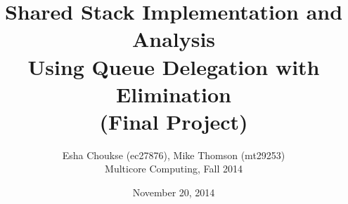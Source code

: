 \documentclass[11pt,letterpaper]{article}
\begin{document}
\title{Shared Stack Implementation and Analysis\\Using Queue Delegation with Elimination\\(Final Project)}
\author{Esha Choukse (ec27876), Mike Thomson (mt29253)\\Multicore Computing, Fall 2014}
\date{November 20, 2014}
\maketitle












\end{document}
